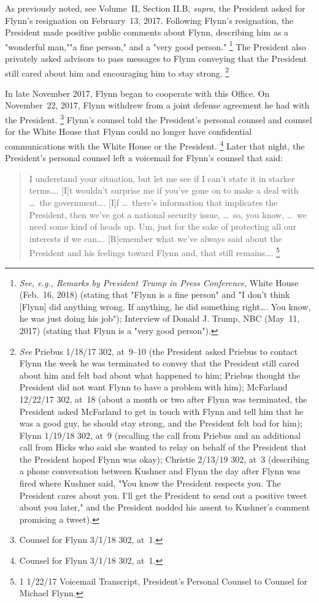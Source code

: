 As previously noted, see Volume~II, Section II.B, \textit{supra}, the President asked for Flynn's resignation on February~13, 2017.
Following Flynn's resignation, the President made positive public comments about Flynn, describing him as a "wonderful man,""a fine person," and a "very good person."%
\footnote{\textit{See, e.g., Remarks by President Trump in Press Conference}, White House (Feb.~16, 2018) (stating that "Flynn is a fine person" and "I don't think [Flynn] did anything wrong.
If anything, he did something right\dots. You know, he was just doing his job");
Interview of Donald J. Trump, NBC (May~11, 2017) (stating that Flynn is a "very good person").}
The President also privately asked advisors to pass messages to Flynn conveying that the President still cared about him and encouraging him to stay strong.%
\footnote{\textit{See} Priebus 1/18/17 302, at~9--10 (the President asked Priebus to contact Flynn the week he was terminated to convey that the President still cared about him and felt bad about what happened to him;
Priebus thought the President did not want Flynn to have a problem with him);
McFarland 12/22/17 302, at~18 (about a month or two after Flynn was terminated, the President asked McFarland to get in touch with Flynn and tell him that he was a good guy, he should stay strong, and the President felt bad for him);
Flynn 1/19/18 302, at~9 (recalling the call from Priebus and an additional call from Hicks who said she wanted to relay on behalf of the President that the President hoped Flynn was okay);
Christie 2/13/19 302, at~3 (describing a phone conversation between Kushner and Flynn the day after Flynn was fired where Kushner said, "You know the President respects you.
The President cares about you.
I'll get the President to send out a positive tweet about you later," and the President nodded his assent to Kushner's comment promising a tweet).}

In late November 2017, Flynn began to cooperate with this Office.
On November~22, 2017, Flynn withdrew from a joint defense agreement he had with the President.%
\footnote{Counsel for Flynn 3/1/18 302, at~1.}
Flynn's counsel told the President's personal counsel and counsel for the White House that Flynn could no longer have confidential communications with the White House or the President.%
\footnote{Counsel for Flynn 3/1/18 302, at~1.}
Later that night, the President's personal counsel left a voicemail for Flynn's counsel that said:

\begin{quote}
I understand your situation, but let me see if I can't state it in starker terms\dots.
[I]t wouldn't surprise me if you've gone on to make a deal with \dots\ the government\dots.
[I]f \dots\ there's information that implicates the President, then we've got a national security issue, \dots\ so, you know, \dots\ we need some kind of heads up.
Um, just for the sake of protecting all our interests if we can\dots.
[R]emember what we've always said about the President and his feelings toward Flynn and, that still remains\dots.%
\footnote{1 1/22/17 Voicemail Transcript, President's Personal Counsel to Counsel for Michael Flynn.}
\end{quote}

